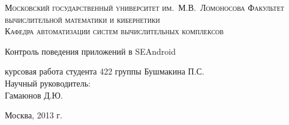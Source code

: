 \begin{titlepage}
	\begin{center}
	\textsc{\large{Московский государственный yниверситет им.~М.В.~Ломоносова}
	\normalsize{Факультет вычислительной математики и кибернетики\\
	Кафедра автоматизации систем вычислительных комплексов}}

	{\Large {Контроль поведения приложений в SEAndroid}} \\[3cm]
	\begin{flushright}
                курсовая работа студента 422 группы
		Бушмакина П.С.\\
		
		Научный руководитель:\\ 
		Гамаюнов Д.Ю.
	\end{flushright}
	\vfill
	
	Москва, 2013 г.
	\end{center}

\end{titlepage}

